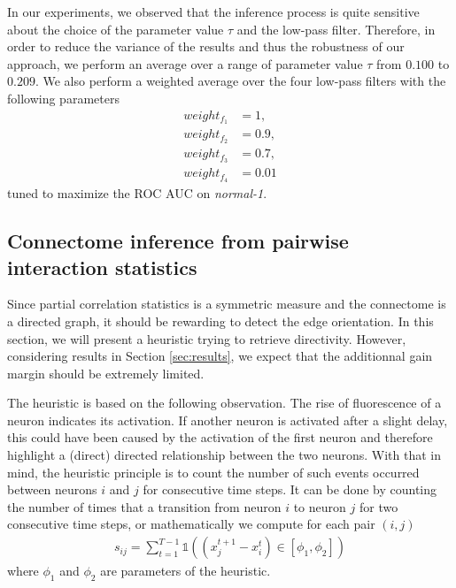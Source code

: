 \documentclass[wcp]{jmlr}
\begin{document}
In our experiments, we observed that the inference process is quite sensitive
about the choice of the parameter value $\tau$ and the low-pass filter.
Therefore, in order to reduce the variance of the results and thus the
robustness of our approach, we perform an average over a range of parameter
value $\tau$ from $0.100$ to $0.209$. We also perform a weighted average over
the four low-pass filters with the following parameters
\begin{align*}
weight_{f_1} &= 1,\\
weight_{f_2} &= 0.9, \\
weight_{f_3} &= 0.7, \\
weight_{f_4} &= 0.01
\end{align*}
tuned to maximize the ROC AUC on \textit{normal-1}.

\subsection*{Connectome inference from pairwise interaction statistics}

Since partial correlation statistics is a symmetric measure and the connectome
is a directed graph, it should be rewarding to detect the edge orientation. In
this section, we will present a heuristic trying to retrieve directivity.
However, considering results in Section \ref{sec:results}, we expect that the
additionnal gain margin should be extremely limited.

The heuristic is based on the following observation. The rise of fluorescence
of a neuron indicates its activation. If another neuron is activated after a
slight delay, this could have been caused by the activation of the first
neuron and therefore highlight a (direct) directed relationship between the
two neurons. With that in mind, the heuristic principle is to count the number
of such events occurred between neurons $i$ and $j$ for consecutive time
steps. It can be done by counting the number of times that a transition from
neuron $i$ to neuron $j$ for two consecutive time steps, or mathematically we
compute for each pair $(i,j)$
\begin{align}
s_{ij} = \sum_{t=1}^{T - 1} \mathbb{1}((x_j^{t+1} - x_i^t) \in \left[\phi_1, \phi_2\right])
\end{align}
where $\phi_1$ and $\phi_2$ are parameters of the heuristic.
\end{document}
